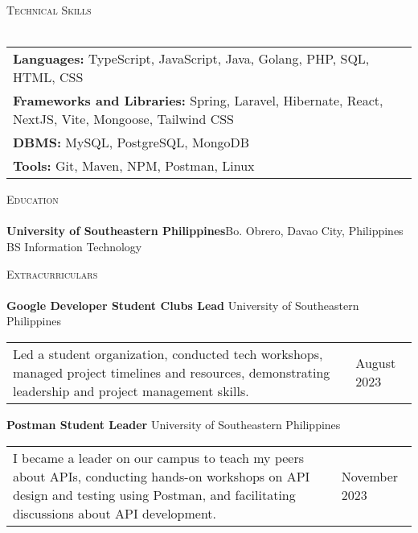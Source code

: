 \documentclass[a4paper]{article}
\newcommand{\lineunder} {
        \vspace*{-8pt} \\
        \hspace*{-18pt} \hrulefill \\
    }
\newcommand{\header} [1] {
        {\vspace*{4mm} \hspace*{-18pt}\vspace*{8pt} \textsc{#1}}
        \vspace*{-6pt} \lineunder
    }
\begin{document}
    \renewcommand{\arraystretch}{1.5}
    \header{Technical Skills}
    \begin{tabular}{ l l }
        \textbf{Languages:} TypeScript, JavaScript, Java, Golang, PHP, SQL, HTML, CSS                   \\
        \textbf{Frameworks and Libraries:} Spring, Laravel, Hibernate, React, NextJS, Vite, Mongoose, Tailwind CSS \\
        \textbf{DBMS:} MySQL, PostgreSQL, MongoDB                                              \\
        \textbf{Tools:} Git, Maven, NPM, Postman, Linux                                       \\
    \end{tabular}
    
    \header{Education}
    \textbf{University of Southeastern Philippines}\hfill Bo. Obrero, Davao City, Philippines\\
    BS Information Technology 


\header{Extracurriculars}
\textbf{Google Developer Student Clubs Lead} \hfill University of Southeastern Philippines\\
\vspace{1mm}
\begin{tabular}{p{} p{}}
Led a student organization, conducted tech workshops, managed project timelines and resources, demonstrating leadership and project management skills. & \hfill August 2023\\
\end{tabular}


\vspace*{2mm}
\textbf{Postman Student Leader} \hfill University of Southeastern Philippines\\
\vspace{1mm}
\begin{tabular}{p{} p{}}
I became a leader on our campus to teach my peers about APIs, conducting hands-on workshops on API design and testing using Postman, and facilitating discussions about API development. & \hfill November 2023\\
\end{tabular}


    
\end{document}
